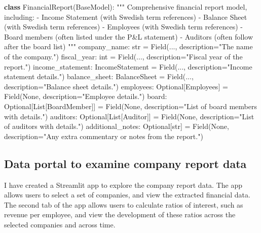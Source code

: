 \documentclass[
]{article}
\newenvironment{Shaded}{\begin{snugshade}}{\end{snugshade}}
\newcommand{\BuiltInTok}[1]{\textcolor[rgb]{0.00,0.23,0.31}{#1}}
\newcommand{\CommentTok}[1]{\textcolor[rgb]{0.37,0.37,0.37}{#1}}
\newcommand{\KeywordTok}[1]{\textcolor[rgb]{0.00,0.23,0.31}{\textbf{#1}}}
\newcommand{\NormalTok}[1]{\textcolor[rgb]{0.00,0.23,0.31}{#1}}
\newcommand{\OperatorTok}[1]{\textcolor[rgb]{0.37,0.37,0.37}{#1}}
\newcommand{\StringTok}[1]{\textcolor[rgb]{0.13,0.47,0.30}{#1}}
\newcommand{\VariableTok}[1]{\textcolor[rgb]{0.07,0.07,0.07}{#1}}
\begin{document}
\begin{Shaded}
\begin{Highlighting}[]
\KeywordTok{class}\NormalTok{ FinancialReport(BaseModel):}
    \CommentTok{"""}
\CommentTok{    Comprehensive financial report model, including:}
\CommentTok{    {-} Income Statement (with Swedish term references)}
\CommentTok{    {-} Balance Sheet (with Swedish term references)}
\CommentTok{    {-} Employees (with Swedish term references)}
\CommentTok{    {-} Board members (often listed under the P\&L statement)}
\CommentTok{    {-} Auditors (often follow after the board list)}
\CommentTok{    """}
\NormalTok{    company\_name: }\BuiltInTok{str} \OperatorTok{=}\NormalTok{ Field(..., description}\OperatorTok{=}\StringTok{"The name of the company."}\NormalTok{)}
\NormalTok{    fiscal\_year: }\BuiltInTok{int} \OperatorTok{=}\NormalTok{ Field(..., description}\OperatorTok{=}\StringTok{"Fiscal year of the report."}\NormalTok{)}
\NormalTok{    income\_statement: IncomeStatement }\OperatorTok{=}\NormalTok{ Field(..., description}\OperatorTok{=}\StringTok{"Income statement details."}\NormalTok{)}
\NormalTok{    balance\_sheet: BalanceSheet }\OperatorTok{=}\NormalTok{ Field(..., description}\OperatorTok{=}\StringTok{"Balance sheet details."}\NormalTok{)}
\NormalTok{    employees: Optional[Employees] }\OperatorTok{=}\NormalTok{ Field(}\VariableTok{None}\NormalTok{, description}\OperatorTok{=}\StringTok{"Employee details."}\NormalTok{)}
\NormalTok{    board: Optional[List[BoardMember]] }\OperatorTok{=}\NormalTok{ Field(}\VariableTok{None}\NormalTok{, description}\OperatorTok{=}\StringTok{"List of board members with details."}\NormalTok{)}
\NormalTok{    auditors: Optional[List[Auditor]] }\OperatorTok{=}\NormalTok{ Field(}\VariableTok{None}\NormalTok{, description}\OperatorTok{=}\StringTok{"List of auditors with details."}\NormalTok{)}
\NormalTok{    additional\_notes: Optional[}\BuiltInTok{str}\NormalTok{] }\OperatorTok{=}\NormalTok{ Field(}\VariableTok{None}\NormalTok{, description}\OperatorTok{=}\StringTok{"Any extra commentary or notes from the report."}\NormalTok{)}
\end{Highlighting}
\end{Shaded}

\newpage{}

\subsection{Data portal to examine company report
data}\label{data-portal-to-examine-company-report-data}

I have created a Streamlit app to explore the company report data. The
app allows users to select a set of companies, and view the extracted
financial data. The second tab of the app allows users to calculate
ratios of interest, such as revenue per employee, and view the
development of these ratios across the selected companies and across
time.
\end{document}
